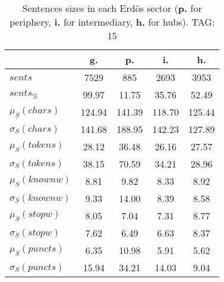 \begin{table}[h!]
\begin{center}
\begin{tabular}{| l || c | c | c | c |}\hline
 & {\bf g.} & {\bf p.} & {\bf i.} & {\bf h.} \\\hline\hline
$sents$ & 7529  & 885  & 2693  & 3953 \\
$sents_{\%}$ & 99.97  & 11.75  & 35.76  & 52.49 \\\hline
$\mu_S(chars)$ & 124.94  & 141.39  & 118.70  & 125.44 \\
$\sigma_S(chars)$ & 141.68  & 188.95  & 142.23  & 127.89 \\\hline
$\mu_S(tokens)$ & 28.12  & 36.48  & 26.16  & 27.57 \\
$\sigma_S(tokens)$ & 38.15  & 70.59  & 34.21  & 28.96 \\\hline
$\mu_S(knownw)$ & 8.81  & 9.82  & 8.33  & 8.92 \\
$\sigma_S(knownw)$ & 9.33  & 14.00  & 8.39  & 8.58 \\\hline
$\mu_S(stopw)$ & 8.05  & 7.04  & 7.31  & 8.77 \\
$\sigma_S(stopw)$ & 7.62  & 6.49  & 6.63  & 8.37 \\\hline
$\mu_S(puncts)$ & 6.35  & 10.98  & 5.91  & 5.62 \\
$\sigma_S(puncts)$ & 15.94  & 34.21  & 14.03  & 9.04 \\\hline
\end{tabular}
\caption{Sentences sizes in each Erd\"os sector ({{\bf p.}} for periphery, {{\bf i.}} for intermediary, {{\bf h.}} for hubs). TAG: 15}
\end{center}
\end{table}